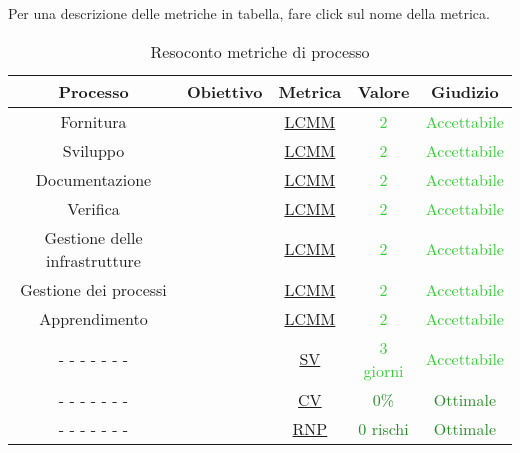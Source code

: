 		
		Per una descrizione delle metriche in tabella, fare click sul nome della metrica.
		\begin{table}[H]
			\centering
			\small
			\begin{tabular}{c | c | c | c | c}
				\hline
				          \textbf{Processo}            & \textbf{Obiettivo}        & \textbf{Metrica}                & \textbf{Valore}                            & \textbf{Giudizio}                           \\ \hline
				          Fornitura           & \nameref{RMC}    & \hyperref[MMC]{LCMM}   & \textcolor{LimeGreen}{2}          & \textcolor{LimeGreen}{Accettabile} \\
				          Sviluppo            & \nameref{RMC}    & \hyperref[MMC]{LCMM}   & \textcolor{LimeGreen}{2}          & \textcolor{LimeGreen}{Accettabile} \\
				       Documentazione         & \nameref{RMC}    & \hyperref[MMC]{LCMM}   & \textcolor{LimeGreen}{2}          & \textcolor{LimeGreen}{Accettabile} \\
						   Verifica            & \nameref{RMC}    & \hyperref[MMC]{LCMM}   & \textcolor{LimeGreen}{2}          & \textcolor{LimeGreen}{Accettabile} \\
				Gestione delle infrastrutture & \nameref{RMC}    & \hyperref[MMC]{LCMM}   & \textcolor{LimeGreen}{2}          & \textcolor{LimeGreen}{Accettabile} \\
				    Gestione dei processi     & \nameref{RMC}    & \hyperref[MMC]{LCMM}   & \textcolor{LimeGreen}{2}          & \textcolor{LimeGreen}{Accettabile} \\
				        Apprendimento         & \nameref{RMC}    & \hyperref[MMC]{LCMM}   & \textcolor{LimeGreen}{2}          & \textcolor{LimeGreen}{Accettabile} \\
				        - - - - - - -         & \nameref{RRDP}   & \hyperref[MRDP]{SV}    & \textcolor{LimeGreen}{3 giorni}   & \textcolor{LimeGreen}{Accettabile} \\
				        - - - - - - -         & \nameref{RRDB}   & \hyperref[MRDB]{CV}    & \textcolor{ForestGreen}{0\%}      & \textcolor{ForestGreen}{Ottimale}  \\
				        - - - - - - -         & \nameref{RCDADR} & \hyperref[MCDADR]{RNP} & \textcolor{ForestGreen}{0 rischi} & \textcolor{ForestGreen}{Ottimale}  \\ \hline
			\end{tabular}
			\caption{Resoconto metriche di processo}
			\label{tab:resoconto_metriche_processo}
		\end{table}
	
